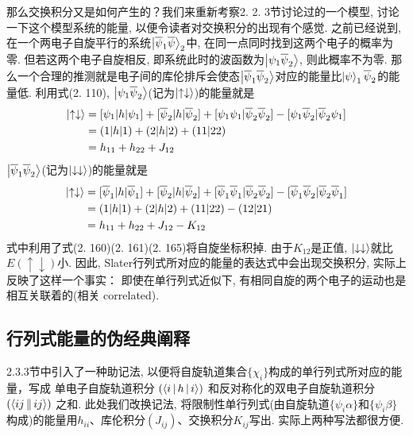 那么交换积分又是如何产生的？我们来重新考察2.
2.
3节讨论过的一个模型, 
讨论一下这个模型系统的能量, 
以便令读者对交换积分的出现有个感觉. 
之前已经说到, 
在一个两电子自旋平行的系统$\Ket{\overline{\psi}_1\overline{\psi}}_2$中, 
在同一点同时找到这两个电子的概率为零. 
但若这两个电子自旋相反, 
即系统此时的波函数为$\Ket{{\psi}_1\overline{\psi}_2}$, 
则此概率不为零. 
那么一个合理的推测就是电子间的库伦排斥会使态$\Ket{\overline{\psi}_1\overline{\psi}_2}$对应的能量比$\Ket{\psi}_1\overline{\psi}_2$的能量低. 
利用式(2.
110), 
$\Ket{\psi_1\overline{\psi}_2}$(记为$\Ket{\uparrow\downarrow}$)的能量就是
\begin{align}
\Ket{\uparrow\downarrow} & =[\psi_1|h|\psi_1] + [\overline{\psi}_2|h|\overline{\psi}_2] + [\psi_1\psi_1|\overline{\psi}_2\overline{\psi}_2] - [\psi_1\overline{\psi}_2|\overline{\psi}_2\psi_1]\notag\\
& = (1|h|1) + (2|h|2) + (11|22)\notag\\
& = h_{11} + h_{22} + J_{12}
\end{align}
$\Ket{\overline{\psi}_1\overline{\psi}_2}$(记为$\Ket{\downarrow\downarrow}$)的能量就是
\begin{align}
\Ket{\uparrow\downarrow} & =[\overline{\psi}_1|h|\overline{\psi}_1] + [\overline{\psi}_2|h|\overline{\psi}_2] + [\overline{\psi}_1\overline{\psi}_1|\overline{\psi}_2\overline{\psi}_2] - [\overline{\psi}_1\overline{\psi}_2|\overline{\psi}_2\overline{\psi}_1]\notag\\
& = (1|h|1) + (2|h|2) + (11|22) - (12|21)\notag\\
& = h_{11} + h_{22} + J_{12} - K_{12}
\end{align}
式中利用了式(2.
160)(2.
161)(2.
165)将自旋坐标积掉. 
由于$K_{12}$是正值, 
$\Ket{\downarrow\downarrow}$就比$E(\uparrow\downarrow)$小. 
因此, 
Slater行列式所对应的能量的表达式中会出现交换积分, 
实际上反映了这样一个事实： 即使在单行列式近似下, 
有相同自旋的两个电子的运动也是相互关联着的(相关 correlated).

\subsection{行列式能量的伪经典阐释}
\label{sec2.3.7}
2.3.3节中引入了一种助记法, 
以便将自旋轨道集合$\{\chi_i\}$构成的单行列式所对应的能量，写成
单电子自旋轨道积分 $(\Braket{i|h|i})$ 和反对称化的双电子自旋轨道积分 $(\Braket{ij||ij})$ 之和. 
此处我们改换记法, 
将限制性单行列式(由自旋轨道$\{ \psi_i\alpha \}$和$\{ \psi_i\beta \}$构成)的能量用$h_{ii}$、库伦积分$(J_{ij})$、交换积分$K_{ij}$写出. 
实际上两种写法都很方便.

